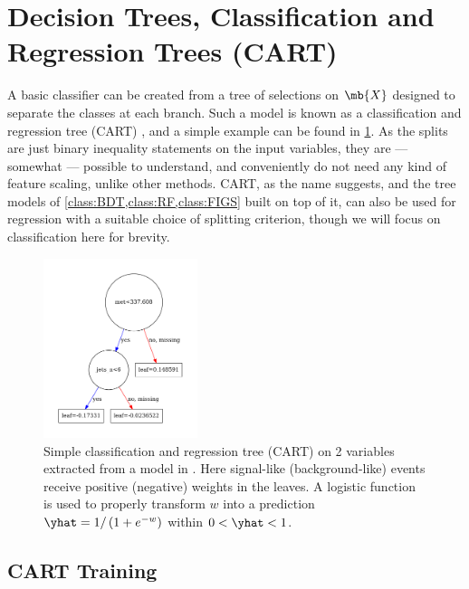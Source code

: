 \section{Decision Trees, \texorpdfstring{\ie}{ie} Classification and Regression Trees (CART)}
\label{class:CART}

A basic classifier can be created from a tree of selections on $\mb{X}$ designed to
separate the classes at each branch.
Such a model is known as a classification and regression tree (CART) \cite{Breiman:2253780},
and a simple example can be found in \cref{fig:small_example_CART}.
As the splits are just binary inequality statements on the input variables,
they are --- somewhat --- possible to understand,
and conveniently do not need any kind of feature scaling, unlike other methods.
CART, as the name suggests,
and the tree models of \cref{class:BDT,class:RF,class:FIGS} built on top of it,
can also be used for regression with a suitable choice of splitting criterion,
though we will focus on classification here for brevity.

\begin{figure}[H]
\centering
\includegraphics[width=0.4\textwidth]{figures/ml/tree7_g2000_n1200}
\caption{
Simple classification and regression tree (CART) on \num{2} variables
extracted from a \xgboost \cite{XGBoost} model in \cite{mepland_dissertation}.
Here signal-like (background-like) events receive positive (negative) weights in the leaves.
A logistic function is used to properly transform $w$ into a prediction
$\yhat = 1 /\left(1+e^{-w}\right)$ within $0 < \yhat < 1$.
}
\label{fig:small_example_CART}
\end{figure}

\subsection{CART Training}
\label{class:CART:train}


